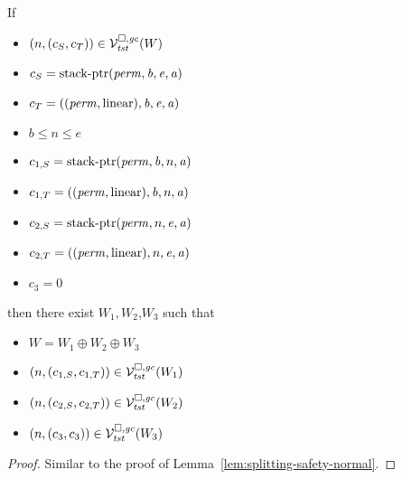 \begin{lemma}
  \label{lem:splitting-safety-stack}
  If
  \begin{itemize}
  \item $\left(n,(c_S,c_T)\right) \in \mathcal{V}^{\square,\mathit{gc}}_{\mathit{tst}}(W)$
  \item $c_S = \mathrm{stack\text{-}ptr}(\mathit{perm},\mathit{b},\mathit{e},\mathit{a})$
  \item $c_T = ((\mathit{perm},\mathrm{linear}),\mathit{b},\mathit{e},\mathit{a})$
  \item $b \le n \le e$
  \item $c_{1,S} = \mathrm{stack\text{-}ptr}(\mathit{perm},\mathit{b},n,\mathit{a})$
  \item $c_{1,T} = ((\mathit{perm},\mathrm{linear}),\mathit{b},n,\mathit{a})$
  \item $c_{2,S} = \mathrm{stack\text{-}ptr}(\mathit{perm},n,\mathit{e},\mathit{a})$
  \item $c_{2,T} = ((\mathit{perm},\mathrm{linear}),n,\mathit{e},\mathit{a})$
  \item $c_3 = 0$
  \end{itemize}
  then there exist $W_1,W_2$,$W_3$ such that
  \begin{itemize}
  \item $W = W_1 \oplus W_2 \oplus W_3$
  \item $\left(n,(c_{1,S},c_{1,T})\right) \in \mathcal{V}^{\square,\mathit{gc}}_{\mathit{tst}}(W_1)$
  \item $\left(n,(c_{2,S},c_{2,T})\right) \in \mathcal{V}^{\square,\mathit{gc}}_{\mathit{tst}}(W_2)$
  \item $\left(n,(c_3,c_3)\right) \in \mathcal{V}^{\square,\mathit{gc}}_{\mathit{tst}}(W_3)$
  \end{itemize}
\end{lemma}
\begin{proof}
  Similar to the proof of Lemma~\ref{lem:splitting-safety-normal}.
\end{proof}

